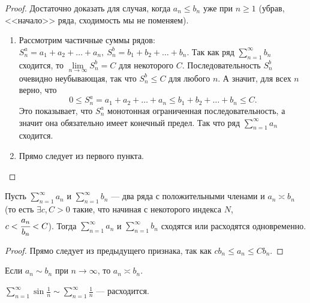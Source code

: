 \documentclass[a4paper, 12pt]{article}
\begin{document}
\begin{proof} Достаточно доказать для случая, когда $a_n \le b_n$ уже при $n \ge 1$ (убрав, <<начало>> ряда, сходимость мы не поменяем).
\begin{enumerate}
\item Рассмотрим частичные суммы рядов: $S^a_n = a_1 + a_2 + \ldots + a_n,\ S^b_n = b_1 + b_2 + \ldots + b_n.$
Так как ряд $\sum\limits_{n=1}^{\infty} b_n$ сходится, то $\lim\limits_{n\to\infty} S^b_n = C$ для некоторого $C$. Последовательность $S^b_n$ очевидно неубывающая, так что $S^b_n \le C$ для любого $n$. А значит, для всех $n$ верно, что
$$ 0 \le S^a_n = a_1 + a_2 + \ldots + a_n \le b_1 + b_2 + \ldots + b_n \le C.$$
Это показывает, что  $S^a_n$ монотонная ограниченная последовательность, а значит она обязательно имеет конечный предел. Так что ряд $\sum\limits_{n=1}^{\infty} a_n$  сходится.
	
\item Прямо следует из первого пункта.
\end{enumerate}
\end{proof}

\begin{Test}
	Пусть $\sum\limits_{n=1}^{\infty} a_n$ и $\sum\limits_{n=1}^{\infty} b_n$ --- два ряда с положительными членами и $a_n \asymp b_n$ (то есть $\exists c, C> 0 $ такие, что начиная с некоторого индекса $N$, \\$c < \cfrac{a_n}{b_n}<C$). Тогда $\sum\limits_{n=1}^{\infty} a_n$ и $\sum\limits_{n=1}^{\infty} b_n$ сходятся или расходятся одновременно.
\end{Test}

\begin{proof}
	Прямо следует из предыдущего признака, так как $ cb_n \leqslant a_n\leqslant Cb_n$. 
\end{proof}
\begin{Comment}
	Если $a_n \sim b_n$ при $n \rightarrow \infty$, то $a_n \asymp b_n$.
\end{Comment}
\begin{Examples}[тривиальный]
	$\sum\limits_{n=1}^{\infty} \sin\frac{1}{n} \sim \sum\limits_{n=1}^{\infty} \frac{1}{n}$ --- расходится.
\end{Examples}
\end{document}
